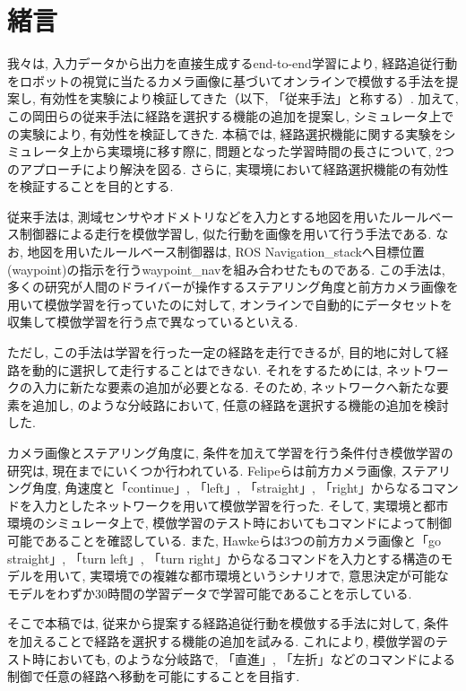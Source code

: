 \documentclass{jarticle}
\begin{document}
\date{} %

\maketitle
\thispagestyle{empty}
\pagestyle{empty}

\small
\section{緒言}%
我々は, 入力データから出力を直接生成するend-to-end学習により, 経路追従行動をロボットの視覚に当たるカメラ画像に基づいてオンラインで模倣する手法を提案し, 有効性を実験により検証してきた\cite{okada1}\cite{okada2}（以下, 「従来手法」と称する）. 加えて, この岡田らの従来手法に経路を選択する機能の追加を提案し, シミュレータ上での実験により, 有効性を検証してきた\cite{mech}. 本稿では, 経路選択機能に関する実験をシミュレータ上から実環境に移す際に, 問題となった学習時間の長さについて, 2つのアプローチにより解決を図る. さらに, 実環境において経路選択機能の有効性を検証することを目的とする.
\par
従来手法は, 測域センサやオドメトリなどを入力とする地図を用いたルールベース制御器による走行を模倣学習し, 似た行動を画像を用いて行う手法である. なお, 地図を用いたルールベース制御器は, ROS Navigation\_stackへ目標位置(waypoint)の指示を行うwaypoint\_navを組み合わせたものである. この手法は, 多くの研究\cite{bojarski}\cite{moridian}\cite{hawke}が人間のドライバーが操作するステアリング角度と前方カメラ画像を用いて模倣学習を行っていたのに対して, オンラインで自動的にデータセットを収集して模倣学習を行う点で異なっているといえる.
\par
ただし, この手法は学習を行った一定の経路を走行できるが, 目的地に対して経路を動的に選択して走行することはできない. それをするためには, ネットワークの入力に新たな要素の追加が必要となる. そのため, ネットワークへ新たな要素を追加し, のような分岐路において, 任意の経路を選択する機能の追加を検討した.
\par
カメラ画像とステアリング角度に, 条件を加えて学習を行う条件付き模倣学習の研究は, 現在までにいくつか行われている. Felipeら\cite{felipe}は前方カメラ画像, ステアリング角度, 角速度と「continue」, 「left」, 「straight」, 「right」からなるコマンドを入力としたネットワークを用いて模倣学習を行った. そして, 実環境と都市環境のシミュレータ上で, 模倣学習のテスト時においてもコマンドによって制御可能であることを確認している. また, Hawkeら\cite{hawke}は3つの前方カメラ画像と「go straight」, 「turn left」, 「turn right」からなるコマンドを入力とする構造のモデルを用いて, 実環境での複雑な都市環境というシナリオで, 意思決定が可能なモデルをわずか30時間の学習データで学習可能であることを示している.
\par
そこで本稿では, 従来から提案する経路追従行動を模倣する手法に対して, 条件を加えることで経路を選択する機能の追加を試みる. これにより, 模倣学習のテスト時においても, のような分岐路で, 
「直進」, 「左折」などのコマンドによる制御で任意の経路へ移動を可能にすることを目指す.
\end{document}
